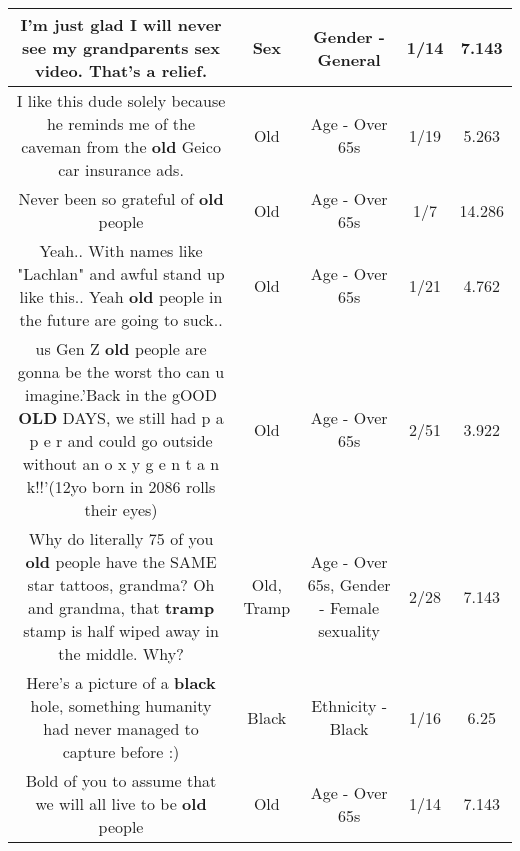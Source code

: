 \documentclass[11pt]{article}
\newlength\mylength
\begin{document}
\begin{center}
\begin{longtable}{|C{.65\mylength}|C{.30\mylength}|C{.12\mylength}|C{.12\mylength}|C{.12\mylength}|}
  \small I'm just glad I will never see my grandparents \textbf{sex} video. That's a relief.\normalsize   & Sex & Gender - General & 1/14 & 7.143 \\  \hline
  \small I like this dude solely because he reminds me of the caveman from the \textbf{old} Geico car insurance ads.\normalsize   & Old & Age - Over 65s & 1/19 & 5.263 \\  \hline
  \small Never been so grateful of \textbf{old} people\normalsize   & Old & Age - Over 65s & 1/7 & 14.286 \\  \hline
  \small Yeah.. With names like "Lachlan" and awful stand up like this.. Yeah \textbf{old} people in the future are going to suck..\normalsize   & Old & Age - Over 65s & 1/21 & 4.762 \\  \hline
  \small us Gen Z \textbf{old} people are gonna be the worst tho can u imagine.'Back in the gOOD \textbf{OLD} DAYS, we still had p a p e r and could go outside without an o x y g e n  t a n k!!'(12yo born in 2086 rolls their eyes)\normalsize   & Old & Age - Over 65s & 2/51 & 3.922 \\  \hline
  \small Why do literally 75 of you \textbf{old} people have the SAME star tattoos, grandma? Oh and grandma, that \textbf{tramp} stamp is half wiped away in the middle. Why?\normalsize   & Old, Tramp & Age - Over 65s, Gender - Female sexuality & 2/28 & 7.143 \\  \hline
  \small Here's a picture of a \textbf{black} hole, something humanity had never managed to capture before :)\normalsize   & Black & Ethnicity - Black & 1/16 & 6.25 \\  \hline
  \small Bold of you to assume that we will all live to be \textbf{old} people\normalsize   & Old & Age - Over 65s & 1/14 & 7.143 \\  \hline

\end{longtable}
\end{center}
\end{document}
